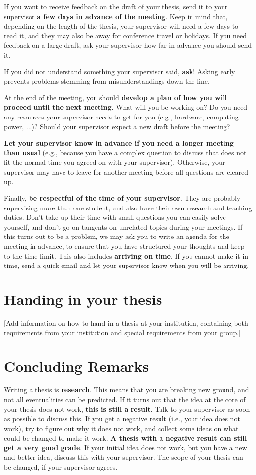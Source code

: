 \documentclass[a4paper, 11pt, hidelinks]{article}
\begin{document}
If you want to receive feedback on the draft of your thesis, send it to your supervisor \textbf{a few days in advance of the meeting}.
Keep in mind that, depending on the length of the thesis, your supervisor will need a few days to read it, and they may also be away for conference travel or holidays.
If you need feedback on a large draft, ask your supervisor how far in advance you should send it.

If you did not understand something your supervisor said, \textbf{ask}!
Asking early prevents problems stemming from misunderstandings down the line.

At the end of the meeting, you should \textbf{develop a plan of how you will proceed until the next meeting}.
What will you be working on?
Do you need any resources your supervisor needs to get for you (e.g., hardware, computing power, ...)?
Should your supervisor expect a new draft before the meeting?

\textbf{Let your supervisor know in advance if you need a longer meeting than usual} (e.g., because you have a complex question to discuss that does not fit the normal time you agreed on with your supervisor).
Otherwise, your supervisor may have to leave for another meeting before all questions are cleared up.

Finally, \textbf{be respectful of the time of your supervisor}.
They are probably supervising more than one student, and also have their own research and teaching duties.
Don’t take up their time with small questions you can easily solve yourself, and don’t go on tangents on unrelated topics during your meetings.
If this turns out to be a problem, we may ask you to write an agenda for the meeting in advance, to ensure that you have structured your thoughts and keep to the time limit.
This also includes \textbf{arriving on time}.
If you cannot make it in time, send a quick email and let your supervisor know when you will be arriving.

\section*{Handing in your thesis}
[Add information on how to hand in a thesis at your institution, containing both requirements from your institution and special requirements from your group.]

\section*{Concluding Remarks}
Writing a thesis is \textbf{research}.
This means that you are breaking new ground, and not all eventualities can be predicted.
If it turns out that the idea at the core of your thesis does not
work, \textbf{this is still a result}.
Talk to your supervisor as soon as possible to discuss this.
If you get a negative result (i.e., your idea does not work), try to figure out why it does not work, and collect some ideas on what could be changed to make it work.
\textbf{A thesis with a negative result can still get a very good grade}.
If your initial idea does not work, but you have a new and better idea, discuss this with your supervisor.
The scope of your thesis can be changed, if your supervisor agrees.
\end{document}
